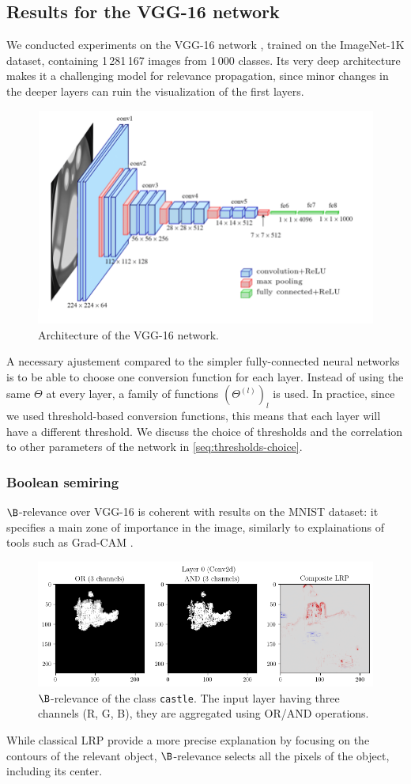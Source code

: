 \documentclass{../cs-classes/cs-classes}
\newcommand*{\1}{\digitsbb{1}}
\newcommand*{\0}{\digitsbb{0}}
\begin{document}
\subsection{Results for the VGG-16 network}
We conducted experiments on the VGG-16 network \cite{vgg}, trained on the ImageNet-1K dataset, containing 1\,281\,167 images from 1\,000 classes. Its very deep architecture makes it a challenging model for relevance propagation, since minor changes in the deeper layers can ruin the visualization of the first layers.
\begin{figure}[H]
    \centering
    \includegraphics[width=.6\textwidth]{vgg-architecture.png}
    \caption{Architecture of the VGG-16 network.}
\end{figure}
A necessary ajustement compared to the simpler fully-connected neural networks is to be able to choose one conversion function for each layer. Instead of using the same $\Theta$ at every layer, a family of functions $(\Theta^{(l)})_l$ is used. In practice, since we used threshold-based conversion functions, this means that each layer will have a different threshold. We discuss the choice of thresholds and the correlation to other parameters of the network in \autoref{seq:thresholds-choice}.

\subsubsection{Boolean semiring}
$\B$-relevance over VGG-16 is coherent with results on the MNIST dataset: it specifies a main zone of importance in the image, similarly to explainations of tools such as Grad-CAM \cite{gradcam}.
\begin{figure}[H]
    \centering
    \includegraphics[width=.9\textwidth]{vgg-boolean.png}
    \caption{$\B$-relevance of the class \texttt{castle}. The input layer having three channels (R, G, B), they are aggregated using OR/AND operations.}
    \label{fig:vgg-boolean}
\end{figure}
While classical LRP provide a more precise explanation by focusing on the contours of the relevant object, $\B$-relevance selects all the pixels of the object, including its center.
\end{document}
